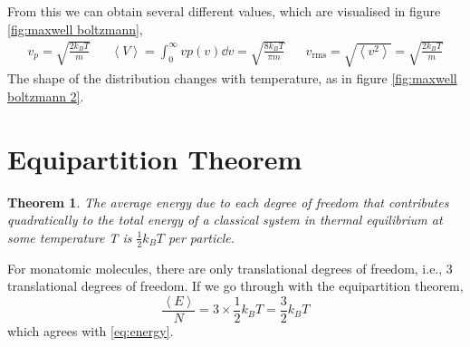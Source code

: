 \documentclass{book}
\newtheorem*{theorem}{Theorem}
\begin{document}
From this we can obtain several different values, which are visualised in figure \ref{fig:maxwell boltzmann},
\begin{align}
	v_p = \sqrt{\frac{2k_BT}{m}} && \left<V\right> = \int_0^{\infty} vp(v) \dd{v} = \sqrt{\frac{8k_BT}{\pi m}} && v_{\text{rms}} = \sqrt{\left<v^2\right>} = \sqrt{\frac{2k_BT}{m}} 
\end{align}
The shape of the distribution changes with temperature, as in figure \ref{fig:maxwell boltzmann 2}.
\section{Equipartition Theorem}
\begin{theorem}
	The average energy due to each degree of freedom that contributes quadratically to the total energy of a classical system in thermal equilibrium at some temperature T is $\frac{1}{2}k_BT$ per particle. 
\end{theorem}
For monatomic molecules, there are only translational degrees of freedom, i.e., 3 translational degrees of freedom. If we go through with the equipartition theorem, 
\begin{equation}
	\frac{\left<E\right>}{N} = 3 \times \frac{1}{2}k_B T = \frac{3}{2}k_BT
\end{equation}
which agrees with \eqref{eq:energy}.
\end{document}
